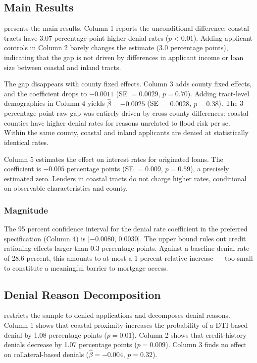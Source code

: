 \documentclass[12pt]{article}
\begin{document}
\subsection{Main Results}

 presents the main results. Column 1 reports the unconditional difference: coastal tracts have 3.07 percentage point higher denial rates ($p < 0.01$). Adding applicant controls in Column 2 barely changes the estimate (3.0 percentage points), indicating that the gap is not driven by differences in applicant income or loan size between coastal and inland tracts.

The gap disappears with county fixed effects. Column 3 adds county fixed effects, and the coefficient drops to $-0.0011$ (SE $= 0.0029$, $p = 0.70$). Adding tract-level demographics in Column 4 yields $\hat{\beta} = -0.0025$ (SE $= 0.0028$, $p = 0.38$). The 3 percentage point raw gap was entirely driven by cross-county differences: coastal counties have higher denial rates for reasons unrelated to flood risk per se. Within the same county, coastal and inland applicants are denied at statistically identical rates.

Column 5 estimates the effect on interest rates for originated loans. The coefficient is $-0.005$ percentage points (SE $= 0.009$, $p = 0.59$), a precisely estimated zero. Lenders in coastal tracts do not charge higher rates, conditional on observable characteristics and county.



\subsubsection*{Magnitude} The 95 percent confidence interval for the denial rate coefficient in the preferred specification (Column 4) is [$-0.0080$, $0.0030$]. The upper bound rules out credit rationing effects larger than 0.3 percentage points. Against a baseline denial rate of 28.6 percent, this amounts to at most a 1 percent relative increase --- too small to constitute a meaningful barrier to mortgage access.

\subsection{Denial Reason Decomposition}

 restricts the sample to denied applications and decomposes denial reasons. Column 1 shows that coastal proximity increases the probability of a DTI-based denial by 1.08 percentage points ($p = 0.01$). Column 2 shows that credit-history denials decrease by 1.07 percentage points ($p = 0.009$). Column 3 finds no effect on collateral-based denials ($\hat{\beta} = -0.004$, $p = 0.32$).
\end{document}
